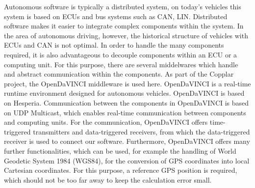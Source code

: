 Autonomous software is typically a distributed system, on today's vehicles this system is based on ECUs and bus systems such as CAN, LIN.
Distributed software makes it easier to integrate complex components within the system. In the area of autonomous driving, however,
the historical structure of vehicles with ECUs and CAN is not optimal. \cite{Broy2006} In order to handle the many components required,
it is also advantageous to decouple components within an ECU or a computing unit. For this purpose,
there are several middelwares which handle and abstract communication within the components. As part of the Copplar project, the OpenDaVINCI middleware is used here.
OpenDaVINCI is a real-time runtime environment designed for autonomous vehicles. OpenDaVINCI is based on Hesperia. \cite{Berger2010} 
Communication between the components in OpenDaVINCI is based on UDP Multicast, which enables real-time communication between components and computing units. \cite{Kurose2013} 
For the communication, OpenDaVINCI offers time-triggered transmitters and data-triggered receivers, 
from which the data-triggered receiver is used to connect our software. Furthermore, OpenDaVINCI offers many further functionalities,
which can be used, for example the handling of World Geodetic System 1984 (WGS84), for the conversion of GPS coordinates into local Cartesian coordinates.
For this purpose, a reference GPS position is required, which should not be too far away to keep the calculation error small.






